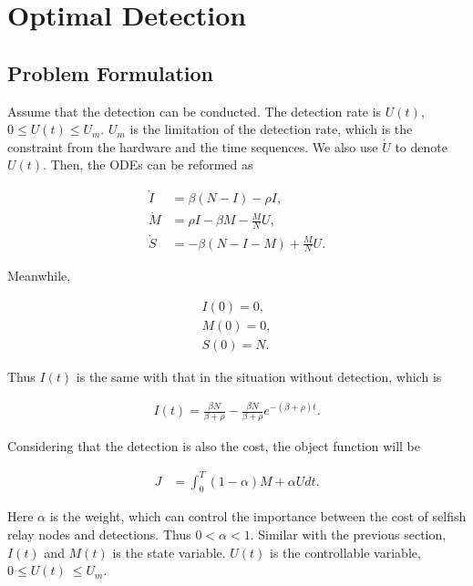 \section{Optimal Detection}
\label{opt_detect}
\subsection{Problem Formulation}
Assume that the detection can be conducted.
The detection rate is $U(t)$, $0 \le U(t) \le U_{m}$.
$U_{m}$ is the limitation of the detection rate, which is the constraint from the hardware and the time sequences.
We also use $\dot{U}$ to denote $U(t)$.
Then, the ODEs can be reformed as
\begin{small}
\begin{equation}
\label{eq:SIM_t}
\begin{aligned}
\dot{I} &= \beta (N-I) - \rho I, \\
\dot{M} &= \rho I  - \beta M - \frac{M}{N} U,\\
\dot{S} &= - \beta (N-I-M) + \frac{M}{N} U.
\end{aligned}
\end{equation}
\end{small}
Meanwhile,
\begin{small}
\begin{equation}
\label{eq:SIM_0}
\begin{aligned}
I(0)=0,\\
M(0)=0,\\
S(0)=N.
\end{aligned}
\end{equation}
\end{small}

Thus $I(t)$ is the same with that in the situation without detection, which is
\begin{small}
\begin{equation}
\label{eq:I}
\begin{aligned}
I(t) = \frac{ \beta N }{ \beta + \rho } - \frac{ \beta N }{ \beta + \rho } e^{-(\beta + \rho)t}.
\end{aligned}
\end{equation}
\end{small}

Considering that the detection is also the cost,
the object function will be
\begin{small}
\begin{equation}
\nonumber
\begin{aligned}
J &= \int_{0}^{T} (1-\alpha) M + \alpha U dt.
\end{aligned}
\end{equation}
\end{small}
Here $\alpha$ is the weight, which can control the importance
between the cost of selfish relay nodes
and detections.
Thus $0 < \alpha < 1$.
Similar with the previous section,
$I(t)$ and $M(t)$ is the state variable.
$U(t)$ is the controllable variable, $0 \le U(t)\ \le U_{m}$.

